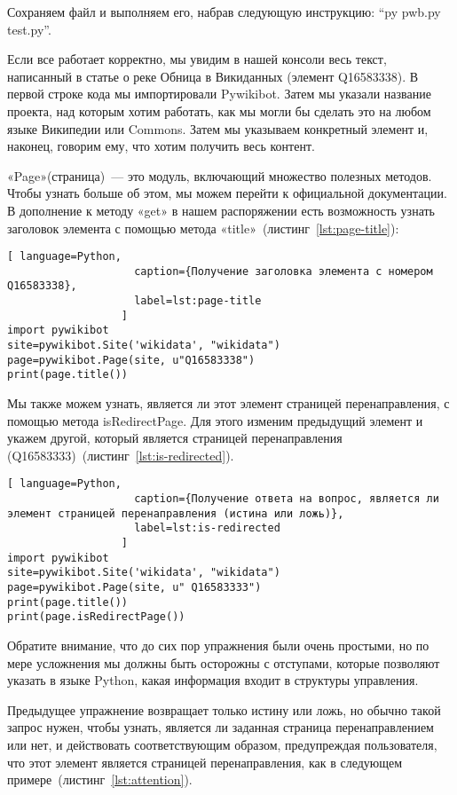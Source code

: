 Сохраняем файл и выполняем его, набрав следующую инструкцию: ``py pwb.py test.py''.

Если все работает корректно, мы увидим в нашей консоли весь текст, написанный в статье о реке Обница в Викиданных (элемент Q16583338). В первой строке кода мы импортировали Pywikibot. Затем мы указали название проекта, над которым хотим работать, как мы могли бы сделать это на любом языке Википедии или Commons. Затем мы указываем конкретный элемент и, наконец, говорим ему, что хотим получить весь контент.

«Page»(страница)~--- это модуль, включающий множество полезных методов. Чтобы узнать больше об этом, мы можем перейти к официальной документации. В дополнение к методу «get» в нашем распоряжении есть возможность узнать заголовок элемента с помощью метода «title»~(листинг~\ref{lst:page-title}):

\begin{lstlisting}[ language=Python,
                    caption={Получение заголовка элемента с номером Q16583338},
                    label=lst:page-title
                  ]
import pywikibot
site=pywikibot.Site('wikidata', "wikidata")
page=pywikibot.Page(site, u"Q16583338")
print(page.title())
\end{lstlisting}

Мы также можем узнать, является ли этот элемент страницей перенаправления, с помощью метода isRedirectPage. Для этого изменим предыдущий элемент и укажем другой, который является страницей перенаправления (Q16583333)~(листинг~\ref{lst:is-redirected}).

\begin{lstlisting}[ language=Python,
                    caption={Получение ответа на вопрос, является ли элемент страницей перенаправления (истина или ложь)},
                    label=lst:is-redirected
                  ]
import pywikibot
site=pywikibot.Site('wikidata', "wikidata")
page=pywikibot.Page(site, u" Q16583333")
print(page.title())
print(page.isRedirectPage())
\end{lstlisting}

Обратите внимание, что до сих пор упражнения были очень простыми, но по мере усложнения мы должны быть осторожны с отступами, которые позволяют указать в языке Python, какая информация входит в структуры управления.

Предыдущее упражнение возвращает только истину или ложь, но обычно такой запрос нужен, чтобы узнать, является ли заданная страница перенаправлением или нет, и действовать соответствующим образом, предупреждая пользователя, что этот элемент является страницей перенаправления, как в следующем примере~(листинг~\ref{lst:attention}).

